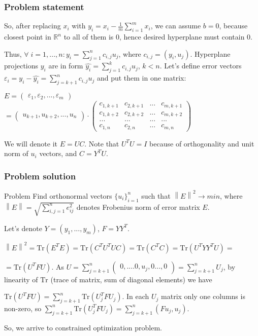\documentclass[10pt,pdf]{beamer}
\newcommand{\norm}[1]{\left\lVert#1\right\rVert}
\newcommand{\dotprod}[2]{\left(#1, #2\right)}
\newcommand{\Tr}[1]{\mathrm{Tr}\left(#1\right)}
\begin{document}
    \begin{frame}
        \frametitle{Problem statement}
        So, after replacing $x_i$ with $y_i = x_i - \frac{1}{m} \sum\limits_{i=1}^m x_i$,
        we can assume $b = 0$, because closest point in $\mathbb{R}^n$ to all of them is $0$,
        hence desired hyperplane must contain $0$.

        Thus, $\forall \; i =1,...,n:{y_i} = \sum\limits_{j=1}^nc_{i, j}u_j$, where $c_{i, j} = \dotprod{y_i}{u_j}$.
        Hyperplane projections ${y_i}$ are in form $\hat{y_i} = \sum\limits_{j=1}^kc_{i, j}u_j$, $k < n$.
        Let's define error vectors ${\varepsilon_i} = {y_i} - \hat{y_i} = \sum\limits_{j=k+1}^nc_{i, j}u_j$ and
        put them in one matrix:

        $E = 
        \begin{pmatrix}
            {\varepsilon_1}, {\varepsilon_2}, ..., {\varepsilon_m} 
        \end{pmatrix}$
        $
        =
        \begin{pmatrix}
            {u_{k+1}}, {u_{k+2}}, ..., {u_{n}}
        \end{pmatrix}
        \cdot
        \begin{pmatrix}
            c_{1, k+1} & c_{2, k+1} & ... & c_{m, k+1}\\
            c_{1, k+2} & c_{2, k+2} & ... & c_{m, k+2}\\
            ... & ... & ... & ... \\
            c_{1, n} & c_{2, n} & ... & c_{m, n}
        \end{pmatrix}$

        We will denote it $E = U C$. Note that $U^T U = I$ because of orthogonality and unit norm of $u_i$ vectors, and
        $C = Y^T U$.
    \end{frame}
    \begin{frame}
        \frametitle{Problem solution}
        \begin{block}{Problem}
            Find orthonormal vectors $\{u_i\}_{i=1}^n$ such that $\norm{E}^2 \rightarrow min$, 
            where $\norm{E} = \sqrt{\sum_{i, j = 1}^n e_{ij}^2}$ denotes Frobenius norm of error matrix $E$.
        \end{block}
        Let's denote $Y = ({y_1}, ..., {y_m})$, $F = Y Y^T$.

        $\norm{E}^2 = \Tr{E^TE} = \Tr{C^T U^T U C} = \Tr{C^T C} =
        \Tr{U^T Y Y^T U} =$ 
        
        $= \Tr{U^T F U}$.
        As $U = \sum\limits_{j=k+1}^n \begin{pmatrix}
            0, .... 0, u_{j}, 0 ..., 0
        \end{pmatrix} = \sum\limits_{j=k+1}^n U_j$, by linearity of $\mathrm{Tr}$ 
        (trace of matrix, sum of diagonal elements) we have

        $\Tr{U^T F U} = \sum\limits_{j = k+1}^n \Tr{U_j^T F U_j}$.
        In each $U_j$ matrix only one columns is non-zero, so
        $\sum\limits_{j = k+1}^n \Tr{U_j^T F U_j} = \sum\limits_{j = k+1}^n \dotprod{F u_j}{u_j}$.
        
        So, we arrive to constrained optimization problem.
    \end{frame}
\end{document}
